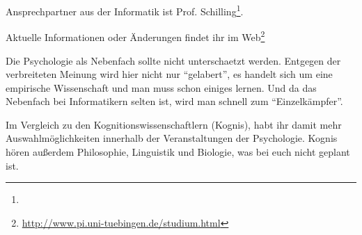 Ansprechpartner aus der Informatik ist Prof. Schilling\footnote{}.

Aktuelle Informationen oder Änderungen findet ihr im Web\footnote{
  \url{http://www.pi.uni-tuebingen.de/studium.html}}

  Die Psychologie als Nebenfach sollte
  nicht unterschaetzt werden. Entgegen der verbreiteten Meinung wird hier
  nicht nur "`gelabert"', es handelt sich um eine empirische Wissenschaft
  und man muss schon einiges lernen.
  Und da das Nebenfach bei Informatikern selten ist, wird man schnell zum
  "`Einzelkämpfer"'.

Im Vergleich zu den Kognitionswissenschaftlern (Kognis), habt ihr damit mehr Auswahlmöglichkeiten innerhalb der Veranstaltungen der Psychologie. Kognis hören außerdem Philosophie, Linguistik und Biologie, was bei euch nicht geplant ist.

